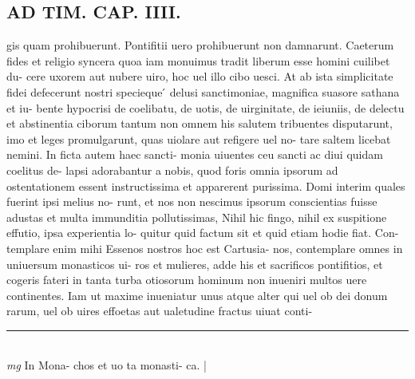 \documentclass{article}
\begin{document}
\begin{pages}
\section*{AD TIM. CAP. IIII. }
\marginpar{[ p.139 ]}\pstart gis quam prohibuerunt. Pontifitii uero prohibuerunt non damnarunt. Caeterum fides et religio syncera quoa iam monuimus tradit liberum esse homini cuilibet du- cere uxorem aut nubere uiro, hoc uel illo cibo uesci. At ab ista simplicitate fidei defecerunt nostri specieque ́ delusi sanctimoniae, magnifica suasore sathana et iu- bente hypocrisi de coelibatu, de uotis, de uirginitate, de ieiuniis, de delectu et abstinentia ciborum tantum non omnem his salutem tribuentes disputarunt, imo et leges promulgarunt, quas uiolare aut refigere uel no- tare saltem licebat nemini. In ficta autem haec sancti- monia uiuentes ceu sancti ac diui quidam coelitus de- lapsi adorabantur a nobis, quod foris omnia ipsorum ad ostentationem essent instructissima et apparerent purissima. Domi interim quales fuerint ipsi melius no- runt, et nos non nescimus ipsorum conscientias fuisse adustas et multa immunditia pollutissimas, Nihil hic fingo, nihil ex suspitione effutio, ipsa experientia lo- quitur quid factum sit et quid etiam hodie fiat. Con- templare enim mihi Essenos nostros hoc est Cartusia- nos, contemplare omnes in uniuersum monasticos ui- ros et mulieres, adde his et sacrificos pontifitios, et cogeris fateri in tanta turba otiosorum hominum non inueniri multos uere continentes. Iam ut maxime inueniatur unus atque alter qui uel ob dei donum rarum, uel ob uires effoetas aut ualetudine fractus uiuat conti-  \pend
\vspace{0.5cm}\noindent
\vspace{0.2cm}\rule{1cm}{0.2pt}\\ 
\hspace{0.2cm}\textit{mg}
\footnotesize In Mona- chos et uo ta monasti- ca. 
\normalsize| 

\end{pages}
\end{document}
